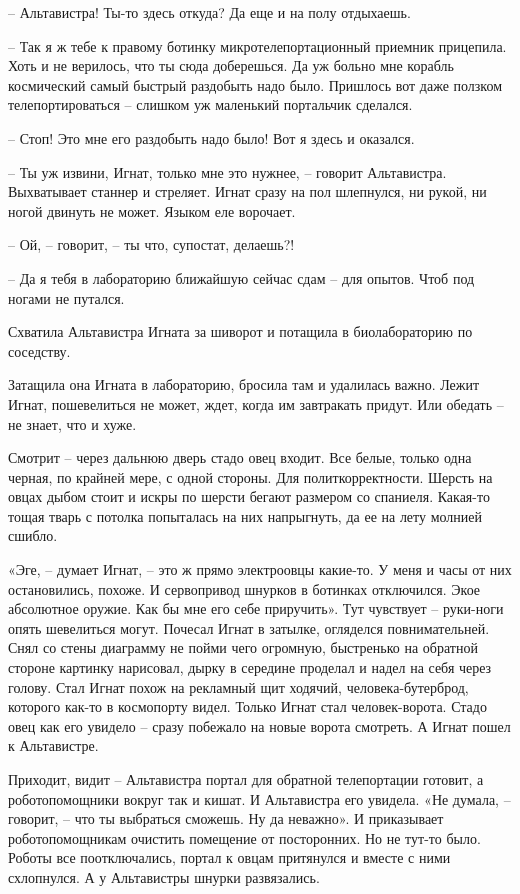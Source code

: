 \documentclass[ebook,oneside,final,openright]{memoir}
\begin{document}
– Альтавистра! Ты-то здесь откуда? Да еще и на полу отдыхаешь.\par
– Так я ж тебе к правому ботинку микротелепортационный приемник прицепила. Хоть и не верилось, что ты сюда доберешься. Да уж больно мне корабль космический самый быстрый раздобыть надо было. Пришлось вот даже ползком телепортироваться – слишком уж маленький портальчик сделался.\par
– Стоп! Это мне его раздобыть надо было! Вот я здесь и оказался.\par
– Ты уж извини, Игнат, только мне это нужнее, – говорит Альтавистра. Выхватывает станнер и стреляет. Игнат сразу на пол шлепнулся, ни рукой, ни ногой двинуть не может. Языком еле ворочает.\par
– Ой, – говорит, – ты что, супостат, делаешь?!\par
– Да я тебя в лабораторию ближайшую сейчас сдам – для опытов. Чтоб под ногами не путался.\par
Схватила Альтавистра Игната за шиворот и потащила в биолабораторию по соседству.\par
\par
Затащила она Игната в лабораторию, бросила там и удалилась важно. Лежит Игнат, пошевелиться не может, ждет, когда им завтракать придут. Или обедать – не знает, что и хуже. \par
Смотрит – через дальнюю дверь стадо овец входит. Все белые, только одна черная, по крайней мере, с одной стороны. Для политкорректности. Шерсть на овцах дыбом стоит и искры по шерсти бегают размером со спаниеля. Какая-то тощая тварь с потолка попыталась на них напрыгнуть, да ее на лету молнией сшибло.\par
\par
«Эге, – думает Игнат, – это ж прямо электроовцы какие-то. У меня и часы от них остановились, похоже. И сервопривод шнурков в ботинках отключился. Экое абсолютное оружие. Как бы мне его себе приручить». Тут чувствует – руки-ноги опять шевелиться могут. Почесал Игнат в затылке, огляделся повнимательней. Снял со стены диаграмму не пойми чего огромную, быстренько на обратной стороне картинку нарисовал, дырку в середине проделал и надел на себя через голову. Стал Игнат похож на рекламный щит ходячий, человека-бутерброд, которого как-то в космопорту видел. Только Игнат стал человек-ворота. Стадо овец как его увидело – сразу побежало на новые ворота смотреть. А Игнат пошел к Альтавистре.\par
\par
Приходит, видит – Альтавистра портал для обратной телепортации готовит, а роботопомощники вокруг так и кишат. И Альтавистра его увидела. «Не думала, – говорит, – что ты выбраться сможешь. Ну да неважно». И приказывает роботопомощникам очистить помещение от посторонних. Но не тут-то было. Роботы все поотключались, портал к овцам притянулся и вместе с ними схлопнулся. А у Альтавистры шнурки развязались.\par
\end{document}
